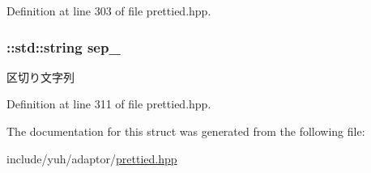 \-Definition at line 303 of file prettied.\-hpp.

\hypertarget{structyuh_1_1range__detail_1_1pretty__forwarder_ae32c4a9c66e100eb1bc143c4e851fb2f}{
\subsubsection[{sep\-\_\-}]{\setlength{\rightskip}{0pt plus 5cm}\-::std\-::string {\bf sep\-\_\-}}}\label{db/d79/structyuh_1_1range__detail_1_1pretty__forwarder_ae32c4a9c66e100eb1bc143c4e851fb2f}
区切り文字列 

\-Definition at line 311 of file prettied.\-hpp.



\-The documentation for this struct was generated from the following file\-:\begin{DoxyCompactItemize}
\item 
include/yuh/adaptor/\hyperlink{prettied_8hpp}{prettied.\-hpp}\end{DoxyCompactItemize}

